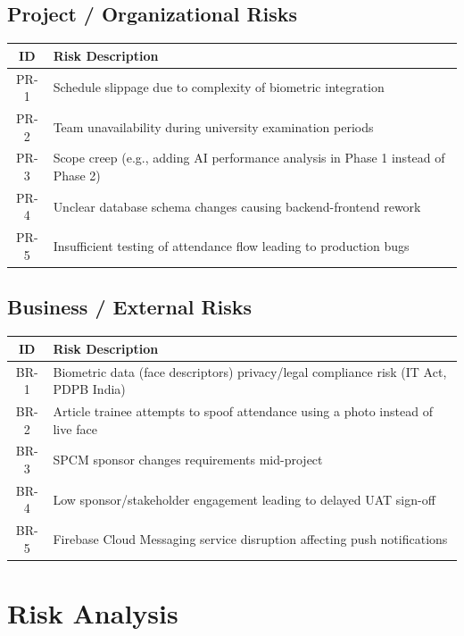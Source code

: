 \documentclass[12pt,a4paper]{article}
\begin{document}
\subsection{Project / Organizational Risks}

\begin{center}
\begin{tabular}{c l}
\toprule
\textbf{ID} & \textbf{Risk Description} \\
\midrule
PR-1 & Schedule slippage due to complexity of biometric integration \\
PR-2 & Team unavailability during university examination periods \\
PR-3 & Scope creep (e.g., adding AI performance analysis in Phase 1 instead of Phase 2) \\
PR-4 & Unclear database schema changes causing backend-frontend rework \\
PR-5 & Insufficient testing of attendance flow leading to production bugs \\
\bottomrule
\end{tabular}
\end{center}

\subsection{Business / External Risks}

\begin{center}
\begin{tabular}{c l}
\toprule
\textbf{ID} & \textbf{Risk Description} \\
\midrule
BR-1 & Biometric data (face descriptors) privacy/legal compliance risk (IT Act, PDPB India) \\
BR-2 & Article trainee attempts to spoof attendance using a photo instead of live face \\
BR-3 & SPCM sponsor changes requirements mid-project \\
BR-4 & Low sponsor/stakeholder engagement leading to delayed UAT sign-off \\
BR-5 & Firebase Cloud Messaging service disruption affecting push notifications \\
\bottomrule
\end{tabular}
\end{center}

\section{Risk Analysis}
\end{document}
